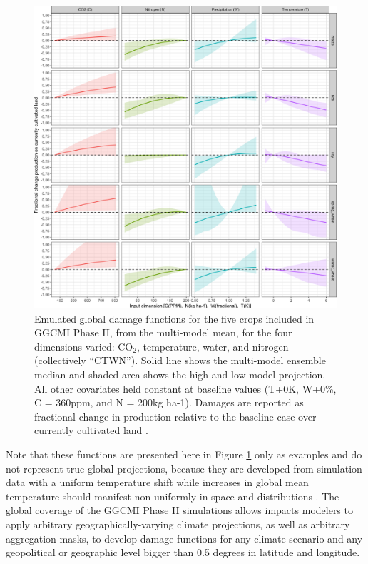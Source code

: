 \documentclass[gmd, manuscript]{copernicus} %
\begin{document}
\begin{figure}[ht]
  \centering
  \includegraphics[width = 15cm]{figures/em_CTWN_all_crops.png}
  \caption{
  Emulated global damage functions for the five crops included in GGCMI Phase II, from the multi-model mean, for the four dimensions varied: CO$_2$, temperature, water, and nitrogen (collectively ``CTWN''). 
  Solid line shows the multi-model ensemble median and shaded area shows the high and low model projection. 
  All other covariates held constant at baseline values (T+0K, W+0\%, C = 360ppm, and N = 200kg ha-1). 
  Damages are reported as fractional change in production relative to the baseline case over currently cultivated land \citep{Portmann2010}.
  }
  \label{fig:all_dims}
\end{figure}

Note that these functions are presented here in Figure \ref{fig:all_dims} only as examples and do not represent true global projections, because they are developed from simulation data with a uniform temperature shift while increases in global mean temperature should manifest non-uniformly in space and distributions \citep[e.g][]{Sippel2015}. 
The global coverage of the GGCMI Phase II simulations allows impacts modelers to apply arbitrary geographically-varying climate projections, as well as arbitrary aggregation masks, to develop damage functions for any climate scenario and any geopolitical or geographic level bigger than 0.5 degrees in latitude and longitude.
\end{document}
